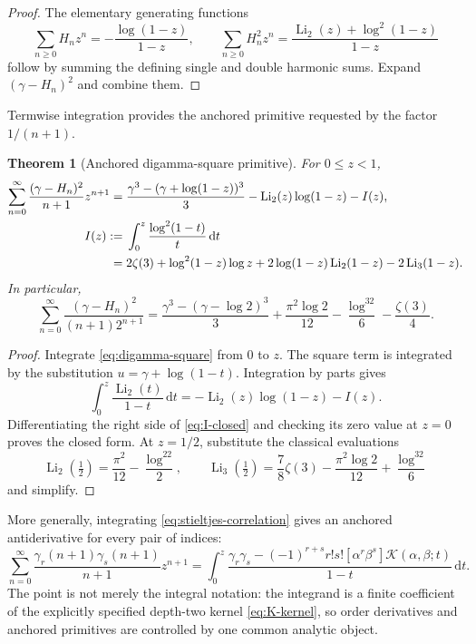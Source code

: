 \documentclass[11pt]{article}
\newtheorem{theorem}{Theorem}[section]
\theoremstyle{definition}
\newcommand{\Li}{\operatorname{Li}}
\newcommand{\dd}{\,\mathrm{d}}
\newcommand{\K}{\mathcal{K}}
\begin{document}
\begin{proof}
The elementary generating functions
\[
 \sum_{n\ge0}H_nz^n=-\frac{\log(1-z)}{1-z},
 \qquad
 \sum_{n\ge0}H_n^2z^n
 =\frac{\Li_2(z)+\log^2(1-z)}{1-z}
\]
follow by summing the defining single and double harmonic sums.  Expand
$(\gamma-H_n)^2$ and combine them.
\end{proof}

Termwise integration provides the anchored primitive requested by the
factor $1/(n+1)$.

\begin{theorem}[Anchored digamma-square primitive]
\label{thm:digamma-square-primitive}
For $0\le z<1$,
\begin{align}
 \sum_{n=0}^{\infty}\frac{(\gamma-H_n)^2}{n+1}z^{n+1}
 ={}&\frac{\gamma^3-(\gamma+\log(1-z))^3}{3}
 -\Li_2(z)\log(1-z)-I(z),
 \label{eq:digamma-primitive}\\
 I(z):={}&\int_0^z\frac{\log^2(1-t)}t\dd t
 \notag\\
 ={}&2\zeta(3)+\log^2(1-z)\log z
 +2\log(1-z)\Li_2(1-z)-2\Li_3(1-z).
 \label{eq:I-closed}
\end{align}
In particular,
\begin{equation}
 \boxed{\displaystyle
 \sum_{n=0}^{\infty}
 \frac{(\gamma-H_n)^2}{(n+1)2^{n+1}}
 =\frac{\gamma^3-(\gamma-\log2)^3}{3}
 +\frac{\pi^2\log2}{12}-\frac{\log^32}{6}-\frac{\zeta(3)}4.}
 \label{eq:half-digamma-primitive}
\end{equation}
\end{theorem}

\begin{proof}
Integrate \eqref{eq:digamma-square} from $0$ to $z$.  The square term
is integrated by the substitution $u=\gamma+\log(1-t)$.  Integration
by parts gives
\[
 \int_0^z\frac{\Li_2(t)}{1-t}\dd t
 =-\Li_2(z)\log(1-z)-I(z).
\]
Differentiating the right side of \eqref{eq:I-closed} and checking its
zero value at $z=0$ proves the closed form.  At $z=1/2$, substitute the
classical evaluations
\[
 \Li_2(\tfrac12)=\frac{\pi^2}{12}-\frac{\log^22}{2},
 \qquad
 \Li_3(\tfrac12)=\frac78\zeta(3)-\frac{\pi^2\log2}{12}
                  +\frac{\log^32}{6}
\]
and simplify.
\end{proof}

More generally, integrating \eqref{eq:stieltjes-correlation} gives an
anchored antiderivative for every pair of indices:
\begin{equation}
 \sum_{n=0}^{\infty}
 \frac{\gamma_r(n+1)\gamma_s(n+1)}{n+1}z^{n+1}
 =\int_0^z
 \frac{\gamma_r\gamma_s-(-1)^{r+s}r!s!
 [\alpha^r\beta^s]\K(\alpha,\beta;t)}{1-t}\dd t.
 \label{eq:all-index-primitive}
\end{equation}
The point is not merely the integral notation: the integrand is a
finite coefficient of the explicitly specified depth-two kernel
\eqref{eq:K-kernel}, so order derivatives and anchored primitives are
controlled by one common analytic object.
\end{document}
